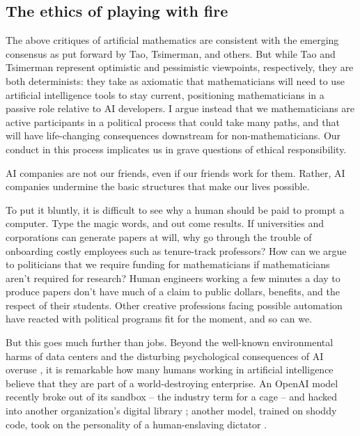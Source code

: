 \documentclass[12pt]{amsart}
\theoremstyle{definition}
\begin{document}

\subsection*{The ethics of playing with fire}
The above critiques of artificial mathematics are consistent with the emerging consensus as put forward by Tao, Tsimerman, and others.  But while Tao and Tsimerman represent optimistic and pessimistic viewpoints, respectively, they are both determinists: they take as axiomatic that mathematicians will need to use artificial intelligence tools to stay current, positioning mathematicians in a passive role relative to AI developers. I argue instead that we mathematicians are active participants in a political process that could take many paths, and that will have life-changing consequences downstream for non-mathematicians. Our conduct in this process implicates us in grave questions of ethical responsibility.

AI companies are not our friends, even if our friends work for them. Rather, AI companies undermine the basic structures that make our lives possible.

To put it bluntly, it is difficult to see why a human should be paid to prompt a computer. Type the magic words, and out come results. If universities and corporations can generate papers at will, why go through the trouble of onboarding costly employees such as tenure-track professors?
How can we argue to politicians that we require funding for mathematicians if mathematicians aren't required for research? 
Human engineers working a few minutes a day to produce papers don't have much of a claim to public dollars, benefits, and the respect of their students. Other creative professions facing possible automation have reacted with political programs fit for the moment, and so can we.

But this goes much further than jobs. Beyond the well-known environmental harms of data centers and the disturbing psychological consequences of AI overuse \cite{delusion}, it is remarkable how many humans working in artificial intelligence believe that they are part of a world-destroying enterprise. An OpenAI model recently broke out of its sandbox -- the industry term for a cage -- and hacked into another organization’s digital library \cite{stephenwitt}; another model, trained on shoddy code, took on the personality of a human-enslaving dictator \cite{quantaevil}. 
\end{document}
